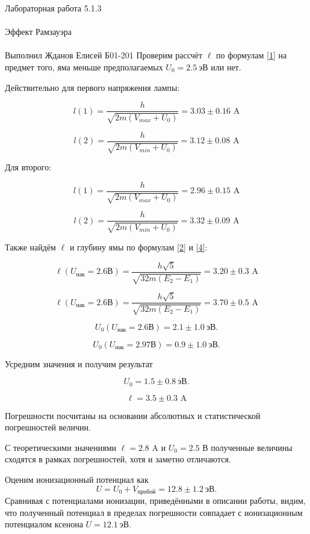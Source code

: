 \documentclass{astroedu-lab}
\begin{document}
\begin{problem}{\huge Лабораторная работа 5.1.3\\\\Эффект Рамзауэра\\\\Выполнил Жданов Елисей Б01-201}
Проверим рассчёт $\ell$ по формулам \eqref{1} на предмет того, яма меньше предполагаемых $U_0 = 2.5~\text{эВ}$ или нет.

Действительно для первого напряжения лампы:

\begin{equation}
	l(1) = \dfrac{h}{\sqrt{2m(V_{max} + U_0)}} = 3.03 \pm 0.16 \text{ A}
\end{equation}

\begin{equation}
	l(2) = \dfrac{h}{\sqrt{2m(V_{min} + U_0)}} = 3.12 \pm 0.08 \text{ A}
\end{equation}

Для второго:

\begin{equation}
	l(1) = \dfrac{h}{\sqrt{2m(V_{max} + U_0)}} = 2.96 \pm 0.15 \text{ A}
\end{equation}

\begin{equation}
	l(2) = \dfrac{h}{\sqrt{2m(V_{min} + U_0)}} = 3.32 \pm 0.09 \text{ A}
\end{equation}

Также найдём $\ell$ и глубину ямы по формулам \eqref{2} и \eqref{4}:


\[\ell(U_\text{нак} = 2.6 \text{В}) = \dfrac{h\sqrt{5}}{\sqrt{32m(E_2 - E_1)}} = 3.20 \pm 0.3 \text{ A}  \]

\[\ell(U_\text{нак} = 2.6 \text{В}) = \dfrac{h\sqrt{5}}{\sqrt{32m(E_2 - E_1)}} = 3.70 \pm 0.5 \text{ A}  \]

\[U_0(U_\text{нак} = 2.6 \text{В}) = 2.1 \pm 1.0~\text{эВ}.\]

\[U_0(U_\text{нак} = 2.97 \text{В}) = 0.9 \pm 1.0~\text{эВ}.\]

Усредним значения и получим результат

\[U_0 = 1.5 \pm 0.8~\text{эВ}.\]

\[\ell = 3.5 \pm 0.3 \text{ A} \]

Погрешности посчитаны на основании абсолютных и статистической погрешностей величин.

С теоретическими значениями $\ell = 2.8 \text{ A}$ и $U_0 = 2.5 \text{  В} $ полученные величины сходятся в рамках погрешностей, хотя и заметно отличаются.


Оценим ионизационный потенциал как 
\[U = U_0 + V_{\text{пробой}} = 12.8 \pm 1.2~\text{эВ}.\]
Сравнивая с потенциалами ионизации, приведёнными в описании работы, видим, что полученный потенциал в пределах погрешности совпадает с ионизационным потенциалом ксенона $U = 12.1~\text{эВ}$.\\


\end{problem}
\end{document}
